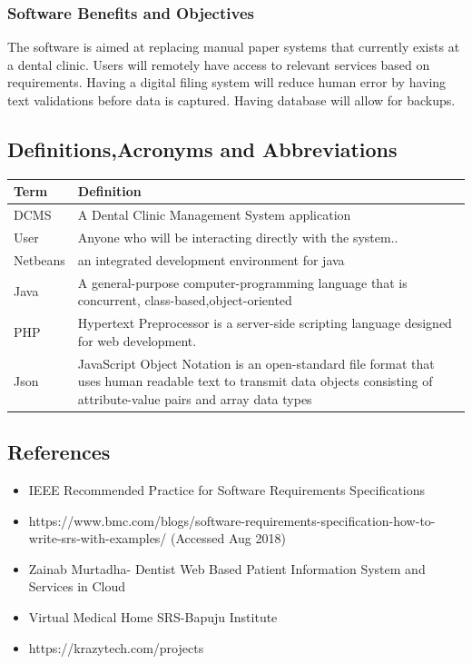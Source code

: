 \documentclass[11 pt]{article}
\begin{document}
\subsubsection{Software Benefits and Objectives}
The software is aimed at replacing manual paper systems that currently exists at a dental clinic.
Users will remotely have access to relevant services based on requirements.
Having a digital filing system will reduce human error by having text validations before data is captured. Having database will allow for backups.

\subsection{Definitions,Acronyms and Abbreviations}
\begin{tabular}{|p{3cm}|p{9cm}|}
\hline
\textbf{Term} & \textbf{Definition}\\
\hline
DCMS & A Dental Clinic Management System application\\
\hline
User & Anyone who will be interacting directly with the system..\\
\hline
Netbeans & an integrated development environment for java\\
\hline
Java & A general-purpose computer-programming language that is concurrent, class-based,object-oriented\\
\hline
PHP & Hypertext Preprocessor is a server-side scripting language designed for web development. \\
\hline
Json & JavaScript Object Notation is an open-standard file format that uses human readable text to transmit data objects consisting of attribute-value pairs and array data types \\
\hline
\end{tabular}

\subsection{References}
\begin{itemize}
\item
IEEE Recommended Practice for Software Requirements Specifications
\item
https://www.bmc.com/blogs/software-requirements-specification-how-to-write-srs-with-examples/ (Accessed Aug 2018)
\item
Zainab Murtadha- Dentist Web Based Patient Information System and Services in Cloud
\item
Virtual Medical Home SRS-Bapuju Institute
\item
https://krazytech.com/projects
\end{itemize}
\newpage
\end{document}
